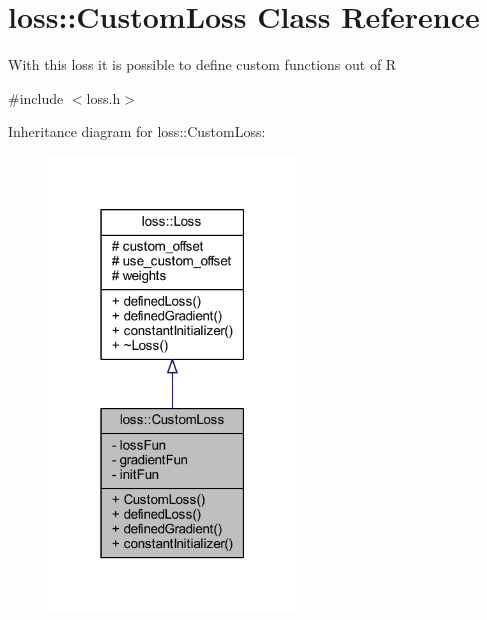 \hypertarget{classloss_1_1_custom_loss}{}\section{loss\+:\+:Custom\+Loss Class Reference}
\label{classloss_1_1_custom_loss}


With this loss it is possible to define custom functions out of {\ttfamily R}  




{\ttfamily \#include $<$loss.\+h$>$}



Inheritance diagram for loss\+:\+:Custom\+Loss\+:
\nopagebreak
\begin{figure}[H]
\begin{center}
\leavevmode
\includegraphics[width=187pt]{classloss_1_1_custom_loss__inherit__graph}
\end{center}
\end{figure}


